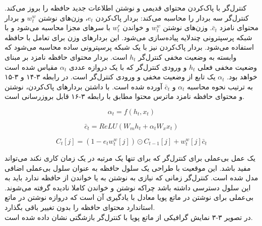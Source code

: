 کنترل‌گر با پاک‌کردن محتوای قدیمی و نوشتن اطلاعات جدید حافظه را بروز می‌کند. کنترل‌گر سه بردار را محاسبه می‌کند: بردار پاک‌کردن $e_t$، وزن‌های نوشتن $w_t^w$ و بردار محتوای نامزد $\bar{c}_t$. وزن‌های نوشتن $w_t^w$ و خواندن $w_t^r$ با سرهای مجزا محاسبه می‌شود و با شبکه پرسپترونی چندلایه  پیاده‌سازی می‌شود. این بردارهای وزن برای تعامل با حافظه استفاده می‌شود. بردار پاک‌کردن نیز با یک شبکه پرسپترونی ساده محاسبه می‌شود که وابسته به وضعیت مخفی کنترل‌گر $h_t$ است. بردار محتوای حافظه نامزد بر مبنای وضعیت مخفی فعلی $h_t$ و ورودی کنترل‌گر که با یک دروازه عددی $\alpha_t$ مقیاس شده است خواهد بود. $\alpha_t$ یک تابع از وضعیت مخفی و ورودی کنترل‌گر است. در رابطه ۳-۱۴ و ۳-۱۵ به ترتیب نحوه محاسبه $\alpha_t$ و $\bar{c}_t$ آورده شده است. با داشتن بردارهای پاک‌کردن، نوشتن و محتوای حافظه نامزد ماترس محتوا مطابق با رابطه ۳-۱۶ قابل بروزرسانی است.\cite{gulcehre2018dynamic}

\begin{equation}
\alpha_t = f(h_t, x_t)
\end{equation}

\begin{equation}
\bar{c}_t = ReLU(W_mh_t + \alpha_tW_xx_t)
\end{equation}

\begin{equation}
C_t[j] = (1-e_tw_t^w[j]) \odot C_{t-1}[j] + w_t^w[j]\bar{c}_t
\end{equation}

یک عمل بی‌عملی برای کنترل‌گر که برای تنها یک مرتبه در یک زمان کاری نکند می‌تواند مفید باشد. این موقعیت با طراحی یک سلول حافظه به عنوان سلول بی‌عملی اضافی مدل شده است. کنترل‌گر زمانی که نیازی به نوشتن به یا خواندن از حافظه ندارد باید به این سلول دسترسی داشته باشد چراکه نوشتن و خواندن کاملا نادیده گرفته می‌شوند. بی‌عملی برای نوشتن در ماتع پویا معادل با یادگیری آن است که دروازه نوشتن در ماتع استاندارد محتوای حافظه را بدون تغییر باقی بگذارد.\cite{gulcehre2018dynamic}
\\

در تصویر ۳-۳ نمایش گرافیکی از ماتع پویا با کنترل‌گر بازشگتی نشان داده شده است.
\\

